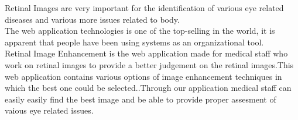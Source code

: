 \begin{Large}
\end{Large}
\vskip 0.1in Retinal Images are very important for the identification of various eye related diseases and various more issues related to body. \\  

\noindent The web application technologies is one of the top-selling in the world, it is apparent that people have been using systems as an organizational tool.\\

\noindent Retinal Image Enhancement is the web application made for medical staff who work on retinal images to provide a better judgement on the retinal images.This web application contains various options of image enhancement techniques in which the best one could be selected..Through our application medical staff can
easily easily find the best image and be able to provide proper assesment of vaious eye related issues.